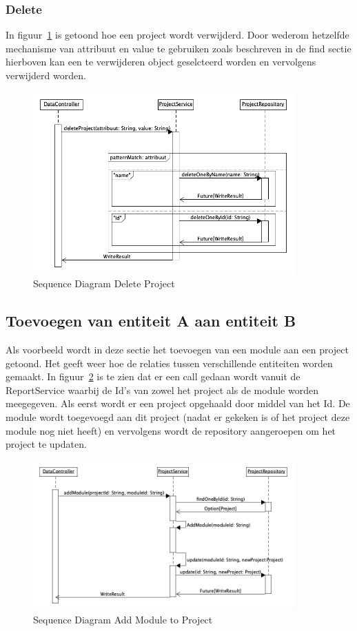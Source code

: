 \subsubsection*{Delete}
In figuur~\ref{fig:seqdiagDeleteProj} is getoond hoe een project wordt verwijderd. Door wederom hetzelfde mechanisme van attribuut en value te gebruiken zoals beschreven in de find sectie hierboven kan een te verwijderen object geselcteerd worden en vervolgens verwijderd worden.
\begin{figure}[h]
    \myfloatalign
    \includegraphics[width=10cm]{gfx/umlet/exports/CRUD-DeleteProject}
    \caption{Sequence Diagram Delete Project }
    \label{fig:seqdiagDeleteProj}
\end{figure}

\subsection{Toevoegen van entiteit A aan entiteit B}\label{subsec:toevoegen-van-entiteit-a-aan-entiteit-b}
Als voorbeeld wordt in deze sectie het toevoegen van een module aan een project getoond. Het geeft weer hoe de relaties tussen verschillende entiteiten worden gemaakt. In figuur~\ref{fig:seqdiagModToProj} is te zien dat er een call
gedaan wordt vanuit de ReportService waarbij de Id's van zowel het project als de module worden meegegeven. Als eerst wordt er een project opgehaald door middel van het Id. De module wordt toegevoegd aan dit project (nadat er gekeken is of het project deze module nog niet heeft) en vervolgens wordt de repository aangeroepen om het project te updaten.
\begin{figure}[h]
    \myfloatalign
    \includegraphics[width=10cm]{gfx/umlet/exports/Relation-ModuleToProject}
    \caption{Sequence Diagram Add Module to Project }
    \label{fig:seqdiagModToProj}
\end{figure}
\newpage
